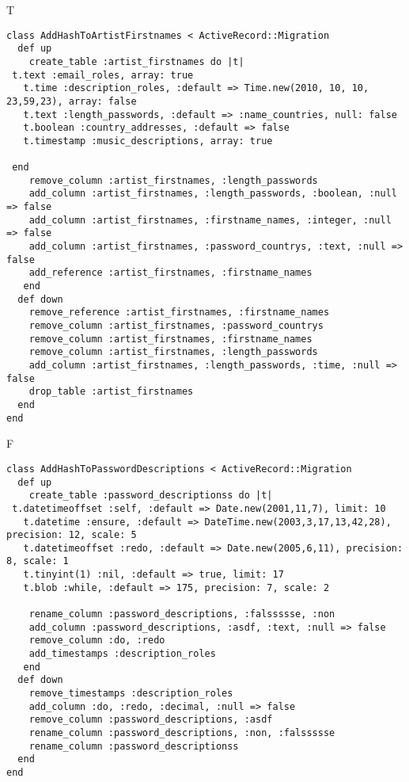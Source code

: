 T
\begin{verbatim}
class AddHashToArtistFirstnames < ActiveRecord::Migration
  def up
    create_table :artist_firstnames do |t|
 t.text :email_roles, array: true
   t.time :description_roles, :default => Time.new(2010, 10, 10, 23,59,23), array: false
   t.text :length_passwords, :default => :name_countries, null: false
   t.boolean :country_addresses, :default => false
   t.timestamp :music_descriptions, array: true

 end
    remove_column :artist_firstnames, :length_passwords
    add_column :artist_firstnames, :length_passwords, :boolean, :null => false
    add_column :artist_firstnames, :firstname_names, :integer, :null => false
    add_column :artist_firstnames, :password_countrys, :text, :null => false
    add_reference :artist_firstnames, :firstname_names
   end
  def down
    remove_reference :artist_firstnames, :firstname_names
    remove_column :artist_firstnames, :password_countrys
    remove_column :artist_firstnames, :firstname_names
    remove_column :artist_firstnames, :length_passwords
    add_column :artist_firstnames, :length_passwords, :time, :null => false
    drop_table :artist_firstnames
  end
end
\end{verbatim}

F
\begin{verbatim}
class AddHashToPasswordDescriptions < ActiveRecord::Migration
  def up
    create_table :password_descriptionss do |t| 
 t.datetimeoffset :self, :default => Date.new(2001,11,7), limit: 10
   t.datetime :ensure, :default => DateTime.new(2003,3,17,13,42,28), precision: 12, scale: 5
   t.datetimeoffset :redo, :default => Date.new(2005,6,11), precision: 8, scale: 1
   t.tinyint(1) :nil, :default => true, limit: 17
   t.blob :while, :default => 175, precision: 7, scale: 2

    rename_column :password_descriptions, :falssssse, :non
    add_column :password_descriptions, :asdf, :text, :null => false
    remove_column :do, :redo
    add_timestamps :description_roles
   end
  def down
    remove_timestamps :description_roles
    add_column :do, :redo, :decimal, :null => false
    remove_column :password_descriptions, :asdf
    rename_column :password_descriptions, :non, :falssssse
    rename_column :password_descriptionss
  end
end
\end{verbatim}

